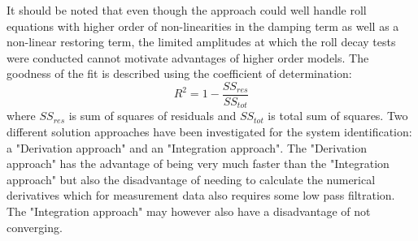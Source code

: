 %
%
%
%




It should be noted that even though the approach could well handle roll equations with higher order of non-linearities in the damping term as well as a non-linear restoring term, the limited amplitudes at which the roll decay tests were conducted cannot motivate advantages of higher order models. 
The goodness of the fit is described using the coefficient of determination:
\begin{equation} \label{eq:R2}
R^2=1-\frac{SS_{res}}{SS_{tot}}
\end{equation}
where $SS_{res}$ is sum of squares of residuals and $SS_{tot}$ is total sum of squares. Two different solution approaches have been investigated for the system identification: a "Derivation approach" and an "Integration approach". 
The "Derivation approach" has the advantage of being very much faster than the "Integration approach" but also the disadvantage of needing to calculate the numerical derivatives which for measurement data also requires some low pass filtration. The "Integration approach" may however also have a disadvantage of not converging.



